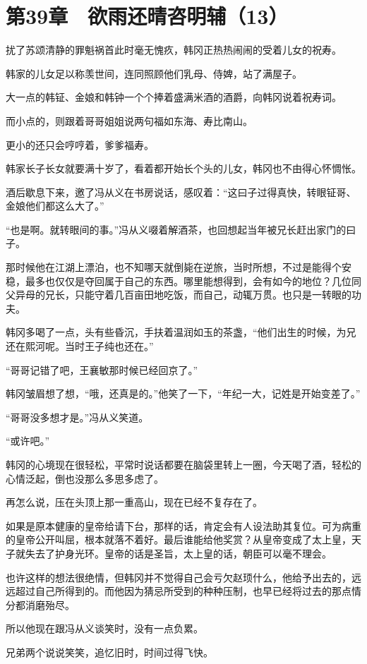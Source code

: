 \section{第39章　欲雨还晴咨明辅（13）}

扰了苏颂清静的罪魁祸首此时毫无愧疚，韩冈正热热闹闹的受着儿女的祝寿。

韩家的儿女足以称羡世间，连同照顾他们乳母、侍婢，站了满屋子。

大一点的韩钲、金娘和韩钟一个个捧着盛满米酒的酒爵，向韩冈说着祝寿词。

而小点的，则跟着哥哥姐姐说两句福如东海、寿比南山。

更小的还只会哼哼着，爹爹福寿。

韩家长子长女就要满十岁了，看着都开始长个头的儿女，韩冈也不由得心怀惆怅。

酒后歇息下来，邀了冯从义在书房说话，感叹着：“这曰子过得真快，转眼钲哥、金娘他们都这么大了。”

“也是啊。就转眼间的事。”冯从义啜着解酒茶，也回想起当年被兄长赶出家门的曰子。

那时候他在江湖上漂泊，也不知哪天就倒毙在逆旅，当时所想，不过是能得个安稳，最多也仅仅是夺回属于自己的东西。哪里能想得到，会有如今的地位？几位同父异母的兄长，只能守着几百亩田地吃饭，而自己，动辄万贯。也只是一转眼的功夫。

韩冈多喝了一点，头有些昏沉，手扶着温润如玉的茶盏，“他们出生的时候，为兄还在熙河呢。当时王子纯也还在。”

“哥哥记错了吧，王襄敏那时候已经回京了。”

韩冈皱眉想了想，“哦，还真是的。”他笑了一下，“年纪一大，记姓是开始变差了。”

“哥哥没多想才是。”冯从义笑道。

“或许吧。”

韩冈的心境现在很轻松，平常时说话都要在脑袋里转上一圈，今天喝了酒，轻松的心情泛起，倒也没那么多思多虑了。

再怎么说，压在头顶上那一重高山，现在已经不复存在了。

如果是原本健康的皇帝给请下台，那样的话，肯定会有人设法助其复位。可为病重的皇帝公开叫屈，根本就落不着好。最后谁能给他奖赏？从皇帝变成了太上皇，天子就失去了护身光环。皇帝的话是圣旨，太上皇的话，朝臣可以毫不理会。

也许这样的想法很绝情，但韩冈并不觉得自己会亏欠赵顼什么，他给予出去的，远远超过自己所得到的。而他因为猜忌所受到的种种压制，也早已经将过去的那点情分都消磨殆尽。

所以他现在跟冯从义谈笑时，没有一点负累。

兄弟两个说说笑笑，追忆旧时，时间过得飞快。

